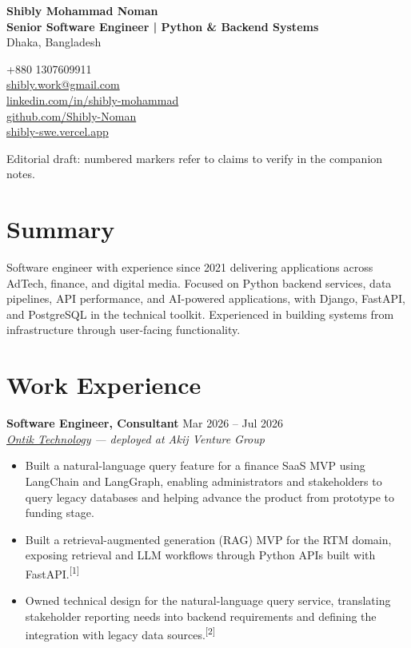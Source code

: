 \documentclass[10pt,a4paper]{article}
\newcommand{\proposed}[2]{#2\textsuperscript{\textcolor{review}{[#1]}}}
\begin{document}
\begin{minipage}[t]{0.59\textwidth}
    \vspace{0pt}
    {\LARGE\textbf{Shibly Mohammad Noman}}\\[4pt]
    \textbf{Senior Software Engineer | Python \& Backend Systems}\\[3pt]
    Dhaka, Bangladesh
\end{minipage}
\hfill
\begin{minipage}[t]{0.40\textwidth}
    \vspace{0pt}
    \raggedleft
    +880 1307609911\\
    \href{mailto:shibly.work@gmail.com}{shibly.work@gmail.com}\\
    \href{https://www.linkedin.com/in/shibly-mohammad/}{linkedin.com/in/shibly-mohammad}\\
    \href{https://github.com/Shibly-Noman}{github.com/Shibly-Noman}\\
    \href{https://shibly-swe.vercel.app/}{shibly-swe.vercel.app}
\end{minipage}

{\footnotesize\color{review}Editorial draft: numbered markers refer to claims to verify in the companion notes.}

\section*{Summary}
Software engineer with experience since 2021 delivering applications across AdTech, finance, and digital media. Focused on Python backend services, data pipelines, API performance, and AI-powered applications, with Django, FastAPI, and PostgreSQL in the technical toolkit. Experienced in building systems from infrastructure through user-facing functionality.

\section*{Work Experience}

\textbf{Software Engineer, Consultant} \hfill Mar 2026 -- Jul 2026\\
\href{https://www.ontiktechnology.com/}{\textit{Ontik Technology}} \textit{--- deployed at Akij Venture Group}
\begin{itemize}
    \item Built a natural-language query feature for a finance SaaS MVP using LangChain and LangGraph, enabling administrators and stakeholders to query legacy databases and helping advance the product from prototype to funding stage.
    \item \proposed{1}{Built a retrieval-augmented generation (RAG) MVP for the RTM domain, exposing retrieval and LLM workflows through Python APIs built with FastAPI.}
    \item \proposed{2}{Owned technical design for the natural-language query service, translating stakeholder reporting needs into backend requirements and defining the integration with legacy data sources.}
\end{itemize}
\end{document}
